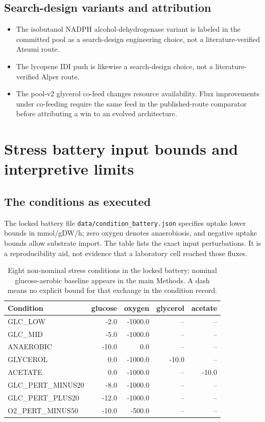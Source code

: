 \subsection{Search-design variants and attribution}\begin{itemize}
\item The isobutanol NADPH alcohol-dehydrogenase variant is labeled in the committed pool as a search-design engineering choice, not a literature-verified Atsumi route.
\item The lycopene IDI push is likewise a search-design choice, not a literature-verified Alper route.
\item The pool-v2 glycerol co-feed changes resource availability. Flux improvements under co-feeding require the same feed in the published-route comparator before attributing a win to an evolved architecture.
\end{itemize}

\section{Stress battery input bounds and interpretive limits}
\subsection{The conditions as executed}
The locked battery file \texttt{data/condition\_battery.json} specifies uptake lower bounds in mmol/gDW/h; zero oxygen denotes anaerobiosis, and negative uptake bounds allow substrate import. The table lists the exact input perturbations. It is a reproducibility aid, not evidence that a laboratory cell reached those fluxes.\begin{table}[!htbp]\centering\small\caption{Eight non-nominal stress conditions in the locked battery; nominal glucose-aerobic baseline appears in the main Methods. A dash means no explicit bound for that exchange in the condition record.}\begin{tabular}{lrrrr}\hline Condition & glucose & oxygen & glycerol & acetate \\\hline
GLC\_LOW & -2.0 & -1000.0 & -- & -- \\
GLC\_MID & -5.0 & -1000.0 & -- & -- \\
ANAEROBIC & -10.0 & 0.0 & -- & -- \\
GLYCEROL & 0.0 & -1000.0 & -10.0 & -- \\
ACETATE & 0.0 & -1000.0 & -- & -10.0 \\
GLC\_PERT\_MINUS20 & -8.0 & -1000.0 & -- & -- \\
GLC\_PERT\_PLUS20 & -12.0 & -1000.0 & -- & -- \\
O2\_PERT\_MINUS50 & -10.0 & -500.0 & -- & -- \\
\hline\end{tabular}\end{table}
